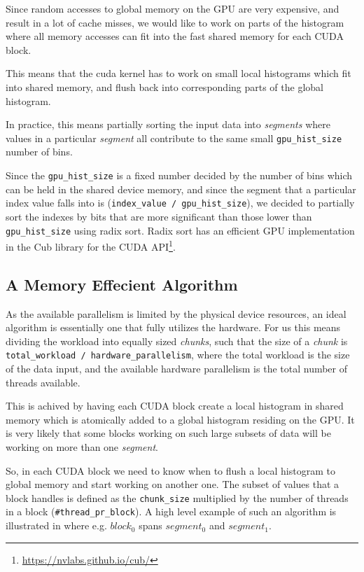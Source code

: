 \documentclass[12pt, a4paper, hidelinks]{article}
\renewcommand{\tt}[1]{\texttt{#1}}
\renewcommand{\it}[1]{\textit{#1}}
\begin{document}
Since random accesses to global memory on the GPU are very
expensive, and result in a lot of cache misses, we would like
to work on parts of the histogram where all memory accesses
can fit into the fast shared memory for each CUDA block.

This means that the cuda kernel has to work on small local histograms
which fit into shared memory, and flush back into corresponding parts of the global histogram.

In practice, this means partially sorting the
input data into \it{segments} where values in a particular \it{segment}
all contribute to the same small \tt{gpu\_hist\_size} number of bins.

Since the \tt{gpu\_hist\_size} is a fixed number
decided by the number of bins which can be held in the shared device memory,
and since the segment that a particular index value falls into
is (\tt{index\_value / gpu\_hist\_size}),
we decided to partially sort the indexes by bits that are more significant than those
lower than \tt{gpu\_hist\_size} using radix sort. Radix sort has an efficient GPU
implementation in the Cub library for the CUDA API\footnote{\url{https://nvlabs.github.io/cub/}}.


\subsection{A Memory Effecient Algorithm}
As the available parallelism is limited by the physical device resources,
an ideal algorithm is essentially one that fully utilizes the hardware.
For us this means dividing the workload into
equally sized \it{chunks}, such that the size of a \it{chunk} is
\tt{total\_workload / hardware\_parallelism},
where the total workload is the size of the data input,
and the available hardware parallelism is the total number of threads available.

This is achived by having each CUDA block create a local histogram in shared memory
which is atomically added to a global histogram residing on the GPU.
It is very likely that some blocks working on such large subsets of data will
be working on more than one \it{segment}.

So, in each CUDA block we need to know when to flush a local histogram to global
memory and start working on another one.
The subset of values that a block handles is defined as the \tt{chunk\_size}
multiplied by the number of threads in a block (\tt{\#thread\_pr\_block}).
A high level example of such an algorithm is illustrated in 
where e.g. $block_0$ spans $segment_0$ and $segment_1$.
\end{document}
